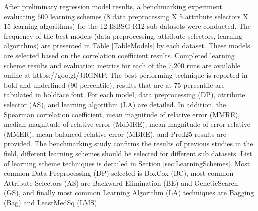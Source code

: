 \documentclass[conference]{IEEEtran}
\begin{document}
After preliminary regression model results, a benchmarking experiment evaluating 600 learning schemes (8 data preprocessing X 5 attribute selectors X 15 learning algorithms) for the 12 ISBSG R12 sub datasets were conducted. The frequency of the best models (data preprocessing, attribute selectors, learning algorithms) are presented in Table \ref{TableModels} by each dataset. These models are selected based on the correlation coefficient results. Completed learning scheme results and evaluation metrics for each of the 7,200 runs are available online at https://goo.gl/JRGNtP. The best performing technique is reported in bold and underlined (90 percentile), results that are at 75 percentile are tabulated in boldface font. For each model, data preprocessing (DP), attribute selector (AS), and learning algorithm (LA) are detailed. In addition, the Spearman correlation coefficient, mean magnitude of relative error (MMRE), median magnitude of relative error (MdMRE), mean magnitude of error relative (MMER), mean balanced relative error (MBRE), and Pred25 results are provided. The benchmarking study confirms the results of previous studies in the field, different learning schemes should be selected for different sub datasets. List of learning scheme techniques is detailed in Section \ref{sec:LearningSchemes}. Most common Data Preprocessing (DP) selected is BoxCox (BC), most common Attribute Selectors (AS) are Backward Elimination (BE) and GeneticSearch (GS), and finally most common Learning Algorithm (LA) techniques are Bagging (Bag) and LeastMedSq (LMS).
\end{document}

